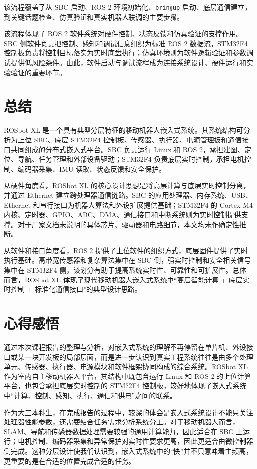 \documentclass[UTF8,a4paper,12pt]{ctexrep}
\begin{document}
该流程覆盖了从 SBC 启动、ROS 2 环境初始化、\texttt{bringup} 启动、底层通信建立，到关键话题检查、仿真验证和真实机器人联调的主要步骤。

该流程体现了 ROS 2 软件系统对硬件控制、状态反馈和仿真验证的支撑作用。SBC 侧软件负责把控制、感知和调试信息组织为标准 ROS 2 数据流，STM32F4 控制板负责将控制目标落实为实时底盘执行；仿真环境则为软件逻辑验证和参数调试提供低风险条件。由此，软件启动与调试流程成为连接系统设计、硬件运行和实验验证的重要环节。

\chapter{总结}

ROSbot XL 是一个具有典型分层特征的移动机器人嵌入式系统。其系统结构可分析为上位 SBC、底层 STM32F4 控制板、传感器、执行器、电源管理板和通信接口共同组成的分布式嵌入式平台。SBC 负责运行 Linux 和 ROS 2，承担建图、定位、导航、任务管理和外部设备驱动；STM32F4 负责底层实时控制，承担电机控制、编码器采集、IMU 读取、状态反馈和安全保护。

从硬件角度看，ROSbot XL 的核心设计思想是将高层计算与底层实时控制分离，并通过 Ethernet 建立跨处理器通信链路。SBC 的应用处理器、内存系统、USB、Ethernet 和串行接口为机器人算法和外设扩展提供基础；STM32F4 的 Cortex-M4 内核、定时器、GPIO、ADC、DMA、通信接口和中断系统则为实时控制提供支撑。对于厂家文档未说明的具体芯片、驱动器和电路细节，本文均未作确定性推断。

从软件和接口角度看，ROS 2 提供了上位软件的组织方式，底层固件提供了实时执行基础。高带宽传感器和复杂算法集中在 SBC 侧，强实时控制和安全相关信号集中在 STM32F4 侧，该划分有助于提高系统实时性、可靠性和可扩展性。总体而言，ROSbot XL 体现了现代移动机器人嵌入式系统中“高层智能计算 + 底层实时控制 + 标准化通信接口”的典型设计思路。

\chapter{心得感悟}

通过本次课程报告的整理与分析，对嵌入式系统的理解不再停留在单片机、外设接口或某一块开发板的局部层面，而是进一步认识到真实工程系统往往是由多个处理单元、传感器、执行器、电源模块和软件框架协同构成的综合系统。ROSbot XL 作为室内自主移动机器人平台，其结构中既包含运行 Linux 和 ROS 2 的上位计算平台，也包含承担底层实时控制的 STM32F4 控制板，较好地体现了嵌入式系统中“计算、控制、感知、执行、通信和供电”之间的联系。

作为大三本科生，在完成报告的过程中，较深的体会是嵌入式系统设计不能只关注处理器性能参数，还需要结合任务需求分析系统分工。对于移动机器人而言，SLAM、导航和传感器数据处理需要较强的通用计算能力，因此适合在 SBC 上运行；电机控制、编码器采集和异常保护对实时性要求更高，因此更适合由微控制器侧完成。这种分层设计使我们认识到，嵌入式系统中的“快”并不只意味着主频高，更重要的是在合适的位置完成合适的任务。
\end{document}
